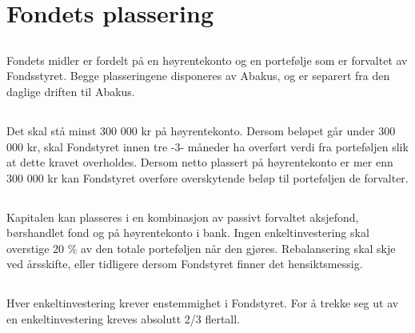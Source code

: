 \section{Fondets plassering}
\subsection{}
Fondets midler er fordelt på en høyrentekonto og en portefølje som er forvaltet av Fondsstyret. Begge plasseringene disponeres av Abakus, og er separert fra den daglige driften til Abakus.

\subsection{}
Det skal stå minst 300 000 kr på høyrentekonto. Dersom beløpet går under 300 000 kr, skal Fondstyret innen tre -3- måneder ha overført verdi fra porteføljen slik at dette kravet overholdes. Dersom netto plassert på høyrentekonto er mer enn 300 000 kr kan Fondstyret overføre overskytende beløp til porteføljen de forvalter.

\subsection{}
Kapitalen kan plasseres i en kombinasjon av passivt forvaltet aksjefond, børshandlet fond og på høyrentekonto i bank. Ingen enkeltinvestering skal overstige 20 \% av den totale porteføljen når den gjøres. Rebalansering skal skje ved årsskifte, eller tidligere dersom Fondstyret finner det hensiktsmessig.

\subsection{}
Hver enkeltinvestering krever enstemmighet i Fondstyret. For å trekke seg ut av en enkeltinvestering kreves absolutt 2/3 flertall.